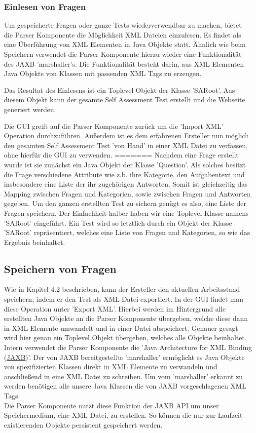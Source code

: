 \subsubsection{Einlesen von Fragen}
Um gespeicherte Fragen oder ganze Tests wiederverwendbar zu machen, bietet die Parser Komponente die Möglichkeit XML Dateien einzulesen.
Es findet als eine Überführung von XML Elementen in Java Objekte statt. Ähnlich wie beim Speichern verwendet die Parser Komponente hierzu wieder eine Funktionalität des JAXB 'marshaller's.
Die Funktionalität besteht darin, aus XML Elementen Java Objekte von Klassen mit passenden XML Tags zu erzeugen.

Das Resultat des Einlesens ist ein Toplevel Objekt der Klasse 'SARoot'. 
Aus diesem Objekt kann der gesamte Self Assessment Test erstellt und die Webseite generiert werden. 

Die GUI greift auf die Parser Komponente zurück um die 'Import XML' Operation durchzuführen. 
Außerdem ist es dem erfahrenen Ersteller nun möglich den gesamten Self Assessment Test 'von Hand' in einer XML Datei zu verfassen, ohne hierfür die GUI zu verwenden. 
=======
Nachdem eine Frage erstellt wurde ist sie zunächst ein Java Objekt der Klasse 'Question'. Als solches besitzt die Frage verschiedene Attribute wie z.b. ihre Kategorie, den Aufgabentext und insbesondere eine Liste der ihr zugehörigen Antworten. Somit ist gleichzeitig das Mapping zwischen Fragen und Kategorien, sowie zwischen Fragen und Antworten gegeben. Um den ganzen erstellten Test zu sichern genügt es also, eine Liste der Fragen speichern. Der Einfachheit halber haben wir eine Toplevel Klasse namens 'SARoot' eingeführt. Ein Test wird so letztlich durch ein Objekt der Klasse 'SARoot' repräsentiert, welches eine Liste von Fragen und Kategorien, so wie das Ergebnis beinhaltet.   

\subsection{Speichern von Fragen}
Wie in Kapitel 4.2 beschrieben, kann der Ersteller den aktuellen Arbeitsstand speichern, indem er den Test als XML Datei exportiert. In der GUI findet man diese Operation unter 'Export XML'.
Hierbei werden im Hintergrund alle erstellten Java Objekte an die Parser Komponente übergeben, welche diese dann in XML Elemente umwandelt und in einer Datei abspeichert. Genauer gesagt wird hier genau ein Toplevel Objekt übergeben, welches alle Objekte beinhaltet.\\
Intern verwendet die Parser Komponente die 'Java Architecture for XML Binding (\href{https://javaee.github.io/jaxb-v2/}{JAXB})'. Der von JAXB bereitgestellte 'marshaller' ermöglicht es Java Objekte von spezifizierten Klassen direkt in XML Elemente zu verwandeln und anschließend in eine XML Datei zu schreiben. Um vom 'marshaller' erkannt zu werden benötigen alle unsere Java Klassen die von JAXB vorgeschlagenen XML Tags.\\
Die Parser Komponente nutzt diese Funktion der JAXB API um unser Speichermedium, eine XML Datei, zu erstellen. So können die nur zur Laufzeit existierenden Objekte persistent gespeichert werden.

